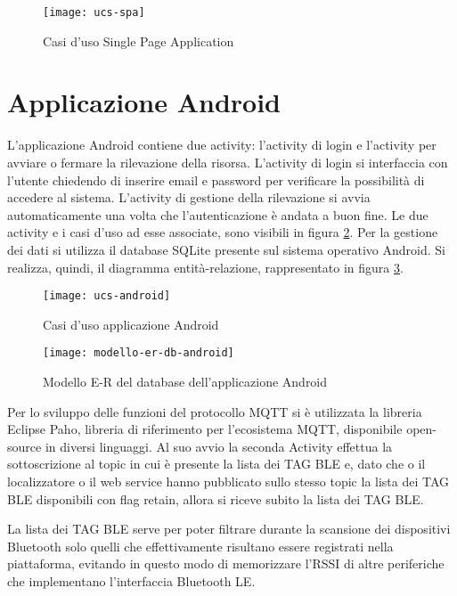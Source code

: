 \begin{figure}[htp]
	\centering
	\texttt{[image: ucs-spa]}
	\caption{Casi d'uso Single Page Application}
	\label{fig:ucs-spa}
\end{figure}

\section{Applicazione Android}
L'applicazione Android contiene due activity: l'activity di login e l'activity per avviare o fermare la rilevazione della risorsa. L’activity di login si interfaccia con l’utente chiedendo di inserire email e password per verificare la possibilità di accedere al sistema. L'activity di gestione della rilevazione si avvia automaticamente una volta che l'autenticazione è andata a buon fine. Le due activity e i casi d'uso ad esse associate, sono visibili in figura \ref{fig:ucs-android}.
Per la gestione dei dati si utilizza il database SQLite presente sul sistema operativo Android. Si realizza, quindi, il diagramma entità-relazione, rappresentato in figura \ref{fig:modello-er-db-android}.

\begin{figure}[htp]
	\centering
	\texttt{[image: ucs-android]}
	\caption{Casi d'uso applicazione Android}
	\label{fig:ucs-android}
\end{figure}

\begin{figure}[htp]
	\centering
	\texttt{[image: modello-er-db-android]}
	\caption{Modello E-R del database dell'applicazione Android}
	\label{fig:modello-er-db-android}
\end{figure}

Per lo sviluppo delle funzioni del protocollo MQTT si è utilizzata la libreria Eclipse Paho, libreria di riferimento per l’ecosistema MQTT, disponibile open-source in diversi linguaggi.
Al suo avvio la seconda Activity effettua la sottoscrizione al topic in cui è presente la lista dei TAG BLE e, dato che o il localizzatore o il web service hanno pubblicato sullo stesso topic la lista dei TAG BLE disponibili con flag retain, allora si riceve subito la lista dei TAG BLE.

La lista dei TAG BLE serve per poter filtrare durante la scansione dei dispositivi Bluetooth solo quelli che effettivamente risultano essere registrati nella piattaforma, evitando in questo modo di memorizzare l'RSSI di altre periferiche che implementano l’interfaccia Bluetooth LE.

